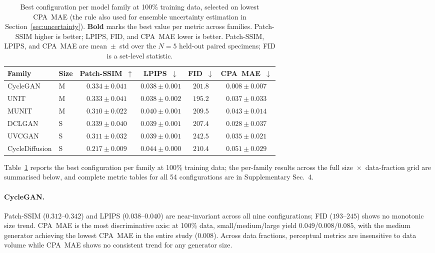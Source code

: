 \begin{table}[t]
\centering
\caption{Best configuration per model family at 100\% training data, selected on
lowest CPA~MAE (the rule also used for ensemble uncertainty estimation in
Section~\ref{sec:uncertainty}). \textbf{Bold} marks the best value per metric
across families. Patch-SSIM higher is better; LPIPS, FID, and CPA~MAE lower is
better. Patch-SSIM, LPIPS, and CPA~MAE are mean~$\pm$~std over the $N{=}5$
held-out paired specimens; FID is a set-level statistic.}
\label{tab:best_per_family}
\small
\begin{tabular}{llcccc}
\toprule
Family & Size & Patch-SSIM~$\uparrow$ & LPIPS~$\downarrow$ & FID~$\downarrow$ & CPA~MAE~$\downarrow$ \\
\midrule
CycleGAN       & M & $0.334 \pm 0.041$         & $\mathbf{0.038} \pm 0.001$ & $201.8$           & $\mathbf{0.008} \pm 0.007$ \\
UNIT           & M & $0.333 \pm 0.041$         & $\mathbf{0.038} \pm 0.002$ & $\mathbf{195.2}$  & $0.037 \pm 0.033$ \\
MUNIT          & M & $0.310 \pm 0.022$         & $0.040 \pm 0.001$         & $209.5$           & $0.043 \pm 0.014$ \\
DCLGAN         & S & $\mathbf{0.339} \pm 0.040$ & $0.039 \pm 0.001$         & $207.4$           & $0.028 \pm 0.037$ \\
UVCGAN         & S & $0.311 \pm 0.032$         & $0.039 \pm 0.001$         & $242.5$           & $0.035 \pm 0.021$ \\
CycleDiffusion & S & $0.217 \pm 0.009$         & $0.044 \pm 0.000$         & $210.4$           & $0.051 \pm 0.029$ \\
\bottomrule
\end{tabular}
\end{table}

Table~\ref{tab:best_per_family} reports the best configuration per family at 100\%
training data; the per-family results across the full size~$\times$~data-fraction
grid are summarised below, and complete metric tables for all 54 configurations are
in Supplementary Sec.~4.

\paragraph{CycleGAN.}
Patch-SSIM ($0.312$--$0.342$) and LPIPS ($0.038$--$0.040$) are near-invariant across
all nine configurations; FID ($193$--$245$) shows no monotonic size trend.
CPA~MAE is the most discriminative axis: at 100\% data, small/medium/large yield
$0.049$/$0.008$/$0.085$, with the medium generator achieving the lowest CPA~MAE in the
entire study ($0.008$).
Across data fractions, perceptual metrics are insensitive to data volume while CPA~MAE
shows no consistent trend for any generator size.


